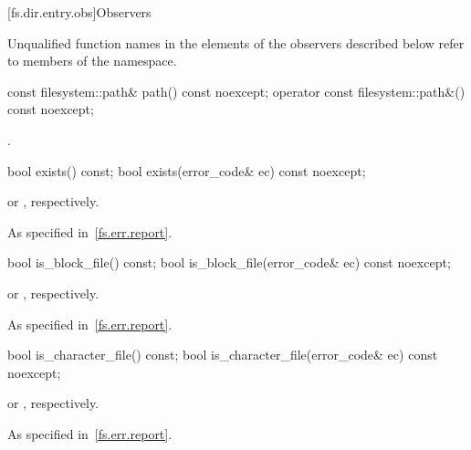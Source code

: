 [fs.dir.entry.obs]{Observers}

\pnum
Unqualified function names in the \returns elements of the
 observers described below refer to members of the
 namespace.

%
%
\begin{itemdecl}
const filesystem::path& path() const noexcept;
operator const filesystem::path&() const noexcept;
\end{itemdecl}

\begin{itemdescr}
\pnum
\returns {}.
\end{itemdescr}

%
\begin{itemdecl}
bool exists() const;
bool exists(error_code& ec) const noexcept;
\end{itemdecl}

\begin{itemdescr}
\pnum
\returns {} or , respectively.

\pnum
\throws As specified in~\ref{fs.err.report}.
\end{itemdescr}

%
\begin{itemdecl}
bool is_block_file() const;
bool is_block_file(error_code& ec) const noexcept;
\end{itemdecl}

\begin{itemdescr}
\pnum
\returns {} or , respectively.

\pnum
\throws As specified in~\ref{fs.err.report}.
\end{itemdescr}

%
\begin{itemdecl}
bool is_character_file() const;
bool is_character_file(error_code& ec) const noexcept;
\end{itemdecl}

\begin{itemdescr}
\pnum
\returns {} or , respectively.

\pnum
\throws As specified in~\ref{fs.err.report}.
\end{itemdescr}

